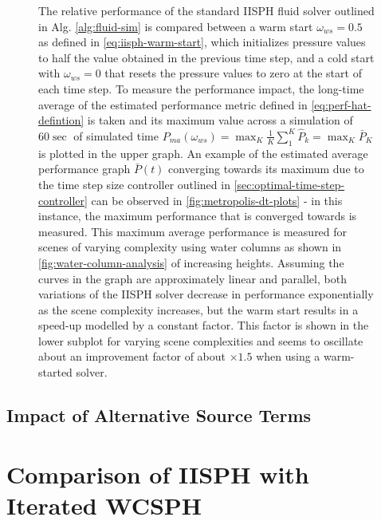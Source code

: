 \documentclass[oneside, a4paper]{book}
\newcommand\br[1]{\left(#1\right)}
\begin{document}
\begin{figure}[H]
        \caption{The relative performance of the standard IISPH fluid solver outlined in Alg. \ref{alg:fluid-sim} is compared between a warm start $\omega_{ws}=0.5$ as defined in \autoref{eq:iisph-warm-start}, which initializes pressure values to half the value obtained in the previous time step, and a cold start with $\omega_{ws}=0$ that resets the pressure values to zero at the start of each time step. To measure the performance impact, the long-time average of the estimated performance metric defined in \autoref{eq:perf-hat-defintion} is taken and its maximum value across a simulation of $60\sec$ of simulated time $P_{ma}\br{\omega_{ws}} = \max_K \frac{1}{K}\sum_{1}^{K}\hat{P}_k = \max_K \bar{P}_K$ is plotted in the upper graph. An example of the estimated average performance graph $\bar{P}(t)$ converging towards its maximum due to the time step size controller outlined in \autoref{sec:optimal-time-step-controller} can be observed in \autoref{fig:metropolis-dt-plots} - in this instance, the maximum performance that is converged towards is measured. This maximum average performance is measured for scenes of varying complexity using water columns as shown in \autoref{fig:water-column-analysis} of increasing heights. Assuming the curves in the graph are approximately linear and parallel, both variations of the IISPH solver decrease in performance exponentially as the scene complexity increases, but the warm start results in a speed-up modelled by a constant factor. This factor is shown in the lower subplot for varying scene complexities and seems to oscillate about an  improvement factor of about $\times 1.5$ when using a warm-started solver.}
        \label{fig:ana-cold-warm}
    \end{figure}
      

      \subsection{Impact of Alternative Source Terms}
    \section{Comparison of IISPH with Iterated WCSPH}
\end{document}
